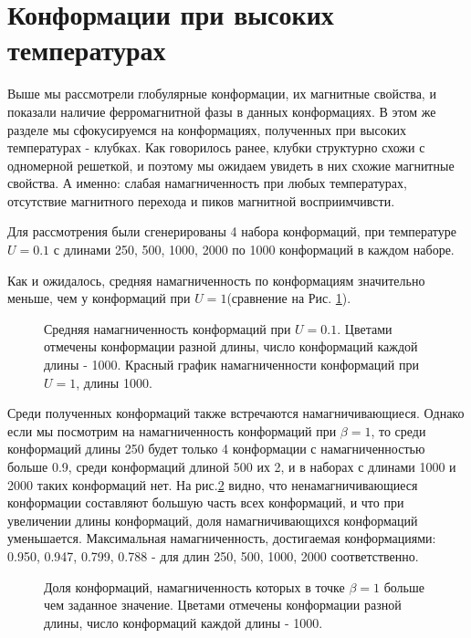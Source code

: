 \section{Конформации при высоких температурах}
Выше мы рассмотрели глобулярные конформации, их магнитные свойства, и показали наличие ферромагнитной фазы в данных конформациях. В этом же разделе мы сфокусируемся на конформациях, полученных при высоких температурах - клубках. Как говорилось ранее, клубки структурно схожи с одномерной решеткой, и поэтому мы ожидаем увидеть в них схожие магнитные свойства. А именно: слабая намагниченность при любых температурах, отсутствие магнитного перехода и пиков магнитной восприимчивсти.

Для рассмотрения были сгенерированы 4 набора конформаций, при температуре $U=0.1$ с длинами 250, 500, 1000, 2000 по 1000 конформаций в каждом наборе. 

Как и ожидалось, средняя намагниченность по конформациям значительно меньше, чем у конформаций при $U = 1$(сравнение на Рис. \ref{fig:U0.1_mean_mag2}).

\begin{figure}[htb]
	\centering
	

	\caption{Средняя намагниченность конформаций при $U=0.1$. Цветами отмечены конформации разной длины, число конформаций каждой длины - 1000. Красный график намагниченности конформаций при $U=1$, длины 1000.}
	\label{fig:U0.1_mean_mag2}
\end{figure}

Среди полученных конформаций также встречаются намагничивающиеся. Однако если мы посмотрим на намагниченность конформаций при $\beta = 1$, то среди конформаций длины 250 будет только 4 конформации с намагниченностью больше 0.9, среди конформаций длиной 500 их 2, и в наборах с длинами 1000 и 2000 таких конформаций нет. На рис.\ref{fig:fraction_magnetization} видно, что ненамагничивающиеся конформации составляют большую часть всех конформаций, и что при увеличении длины конформаций, доля намагничивающихся конформаций уменьшается. Максимальная намагниченность, достигаемая конформациями: 0.950, 0.947, 0.799, 0.788 - для длин 250, 500, 1000, 2000 соответственно.

\begin{figure}[htb]
	\centering
	
	\caption{Доля конформаций, намагниченность которых в точке $\beta = 1$ больше чем заданное значение. Цветами отмечены конформации разной длины, число конформаций каждой длины - 1000.}
	\label{fig:fraction_magnetization}
\end{figure}

